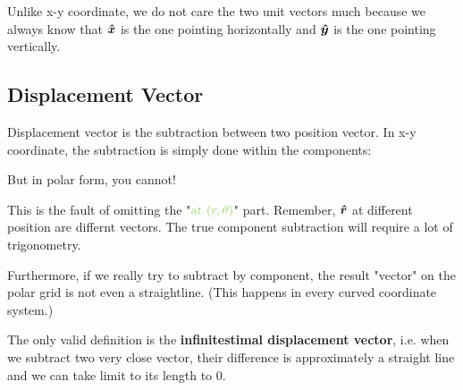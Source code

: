 \documentclass[class=article, crop=false, 12pt]{standalone}
\begin{document}

Unlike x-y coordinate, 
we do not care the two unit vectors much because we always know that 
$\vu*{x}$ is the one pointing horizontally and $\vu*{y}$ is the one pointing vertically.





\subsection{Displacement Vector}

Displacement vector is the subtraction between two position vector. 
In x-y coordinate, the subtraction is simply done within the components:

But in polar form, you cannot!

This is the fault of omitting the "$\green{\text{at }(r,\theta)}$" part. 
Remember, $\vu*{r}$ at different position are differnt vectors. 
The true component subtraction will require a lot of trigonometry. 


Furthermore, if we really try to subtract by component, 
the result "vector" on the polar grid is not even a straightline. 
(This happens in every curved coordinate system.)


The only valid definition is the \textbf{infinitestimal displacement vector}, 
i.e. when we subtract two very close vector, 
their difference is approximately a straight line and we can take limit to its length to $0$. 
\end{document}
